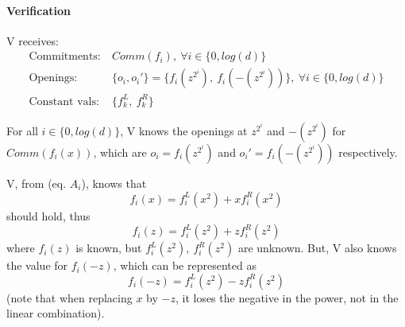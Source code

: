 \documentclass{article}
\theoremstyle{definition}
\begin{document}
% 
% 


\paragraph{Verification}

V receives:
\begin{align*}
	\text{Commitments:}~ &Comm(f_i),~ \forall i \in \{0, log(d)\}\\
	\text{Openings:}~ &\{o_i, o_i'\}=\{ f_i(z^{2^i}),~f_i(-(z^{2^i})) \},~ \forall i \in \{0, log(d)\}\\
	\text{Constant vals:}~ &\{f_k^L,~f_k^R\}
\end{align*}

\vspace{20px}

For all $i \in \{0, log(d)\}$, V knows the openings at $z^{2^i}$ and $-(z^{2^i})$ for\\
$Comm(f_i(x))$, which are $o_i=f_i(z^{2^i})$ and $o_i'=f_i(-(z^{2^i}))$ respectively.

V, from (eq. $A_i$), knows that
$$f_i(x)=f_i^L(x^2) + x f_i^R(x^2)$$
should hold, thus
$$f_i(z)=f_i^L(z^2) + z f_i^R(z^2)$$
where $f_i(z)$ is known, but $f_i^L(z^2),~f_i^R(z^2)$ are unknown.
But, V also knows the value for $f_i(-z)$, which can be represented as
$$f_i(-z)=f_i^L(z^2) - z f_i^R(z^2)$$
(note that when replacing $x$ by $-z$, it loses the negative in the power, not in the linear combination).
\end{document}
